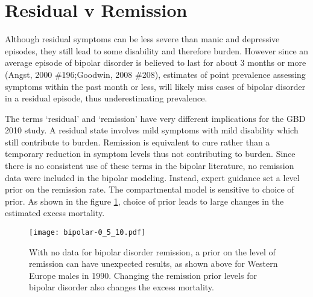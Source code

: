 \section{Residual v Remission}
Although residual symptoms can be less severe than manic and depressive episodes, they still lead to some disability and therefore burden.  However since an average episode of bipolar disorder is believed to last for about 3 months or more (Angst, 2000 \#196;Goodwin, 2008 \#208), estimates of point prevalence assessing symptoms within the past month or less, will likely miss cases of bipolar disorder in a residual episode, thus underestimating prevalence.

The terms `residual' and `remission' have very different implications for the GBD 2010 study.  A residual state involves mild symptoms with mild disability which still contribute to burden. Remission is equivalent to cure rather than a temporary reduction in symptom levels thus not contributing to burden. Since there is no consistent use of these terms in the bipolar literature, no remission data were included in the bipolar modeling. Instead, expert guidance set a level prior on the remission rate.  The compartmental model is sensitive to choice of prior. As shown in the figure \ref{fig:app-bipolar remission}, choice of prior leads to large changes in the estimated excess mortality.

    \begin{figure}[h]
        \begin{center}
            \texttt{[image: bipolar-0\_5\_10.pdf]}
            \caption{With no data for bipolar disorder remission, a prior on the level of remission can have unexpected results, as shown above for Western Europe males in 1990.  Changing the remission prior levels for bipolar disorder also changes the excess mortality.}
            \label{fig:app-bipolar remission}
        \end{center}
    \end{figure}

